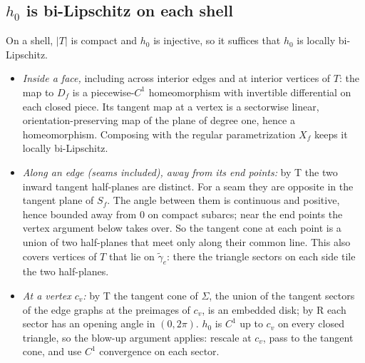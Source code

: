 \subsection{$h_0$ is bi-Lipschitz on each shell}
On a shell, $|T|$ is compact and $h_0$ is injective, so it suffices that $h_0$ is locally bi-Lipschitz.
\begin{itemize}
\item \emph{Inside a face,} including across interior edges and at interior vertices of $T$: the map to $D_f$ is a
piecewise-$C^1$ homeomorphism with invertible differential on each closed piece. Its tangent map at a vertex is a
sectorwise linear, orientation-preserving map of the plane of degree one, hence a homeomorphism. Composing with the
regular parametrization $X_f$ keeps it locally bi-Lipschitz.
\item \emph{Along an edge (seams included), away from its end points:} by T the two inward tangent half-planes are
distinct. For a seam they are opposite in the tangent plane of $S_f$. The angle between them is continuous and
positive, hence bounded away from $0$ on compact subarcs; near the end points the vertex argument below takes over. So the tangent cone at
each point is a union of two half-planes that meet only along their common line. This also covers vertices of $T$ that
lie on $\tilde\gamma_e$: there the triangle sectors on each side tile the two half-planes.
\item \emph{At a vertex $c_v$:} by T the tangent cone of $\Sigma$, the union of the tangent sectors of the edge graphs at
the preimages of $c_v$, is an embedded disk; by R each sector has an opening angle in $(0,2\pi)$. $h_0$ is $C^1$ up to $c_v$ on every
closed triangle, so the blow-up argument applies: rescale at $c_v$, pass to the tangent cone, and use $C^1$ convergence
on each sector.
\end{itemize}

